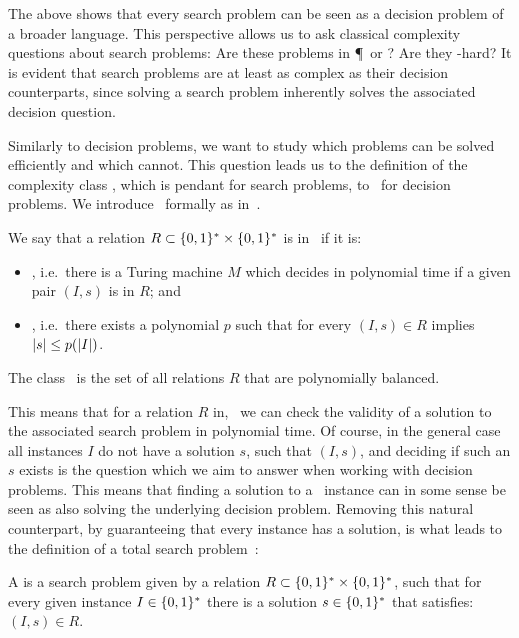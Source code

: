 The above shows that every search problem can be seen as a decision problem of a broader language. This perspective allows us to ask classical complexity questions about search problems: Are these problems in \P\ or \NP\@? Are they \NP-hard? It is evident that search problems are at least as complex as their decision counterparts, since solving a search problem inherently solves the associated decision question.

Similarly to decision problems, we want to study which problems can be solved efficiently and which cannot. This question leads us to the definition of the complexity class \FNP, which is pendant for search problems, to  \NP\ for decision problems. We introduce \FNP\ formally as in~.

\begin{definition}
	We say that a relation $R\subset \{0, 1\}^* \times \{0, 1\}^*$ is in \FNP\ if it is:
	\begin{itemize}
		\item {}, i.e.\ there is a Turing machine $M$ which decides in polynomial time if a given pair $(I, s)$ is in $R$; and
		\item  {}, i.e.\ there exists a polynomial $p$ such that for every $(I, s) \in R$ implies $\left\lvert s\right\rvert \leq p(\left\lvert I\right\rvert)$.
	\end{itemize}
	The class \FNP\ is the set of all relations $R$ that are polynomially balanced.
\end{definition}

This means that for a relation $R$ in, \FNP\ we can check the validity of a solution to the associated search problem in polynomial time. Of course, in the general case all instances $I$ do not have a solution $s$, such that $(I, s)$, and deciding if such an $s$ exists is the question which we aim to answer when working with decision problems. This means that finding a solution to a \FNP\ instance can in some sense be seen as also solving the underlying decision problem. Removing this natural counterpart, by guaranteeing that every instance has a solution, is what leads to the definition of a total search problem~\cite{megiddo_total_1991}:

\begin{definition}
	A  is a search problem given by a relation $R\subset \{0, 1\}^* \times \{0, 1\}^*$, such that for every given instance $I\in
		\{0, 1\}^*$ there is a solution $s \in \{0, 1\}^*$ that satisfies: $(I, s) \in R$.
\end{definition}

